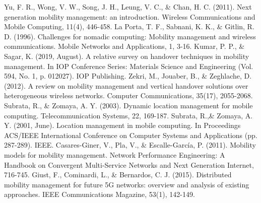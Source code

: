 \documentclass[12pt]{report}
\begin{document}
\newpage
\renewcommand{\bibname}{References}
\begin{thebibliography}{}
    Yu, F. R., Wong, V. W., Song, J. H., Leung, V. C., \& Chan, H. C. (2011). Next generation mobility management: an introduction. Wireless Communications and Mobile Computing, 11(4), 446-458.
    La Porta, T. F., Sabnani, K. K., \& Gitlin, R. D. (1996). Challenges for nomadic computing: Mobility management and wireless communications. Mobile Networks and Applications, 1, 3-16.
    Kumar, P. P., \& Sagar, K. (2019, August). A relative survey on handover techniques in mobility management. In IOP Conference Series: Materials Science and Engineering (Vol. 594, No. 1, p. 012027). IOP Publishing.
    Zekri, M., Jouaber, B., \& Zeghlache, D. (2012). A review on mobility management and vertical handover solutions over heterogeneous wireless networks. Computer Communications, 35(17), 2055-2068.
    Subrata, R., \& Zomaya, A. Y. (2003). Dynamic location management for mobile computing. Telecommunication Systems, 22, 169-187.
    Subrata, R.,\& Zomaya, A. Y. (2001, June). Location management in mobile computing. In Proceedings ACS/IEEE International Conference on Computer Systems and Applications (pp. 287-289). IEEE.
    Casares-Giner, V., Pla, V., \& Escalle-García, P. (2011). Mobility models for mobility management. Network Performance Engineering: A Handbook on Convergent Multi-Service Networks and Next Generation Internet, 716-745.
    Giust, F., Cominardi, L., \& Bernardos, C. J. (2015). Distributed mobility management for future 5G networks: overview and analysis of existing approaches. IEEE Communications Magazine, 53(1), 142-149.
\end{thebibliography}
\end{document}
